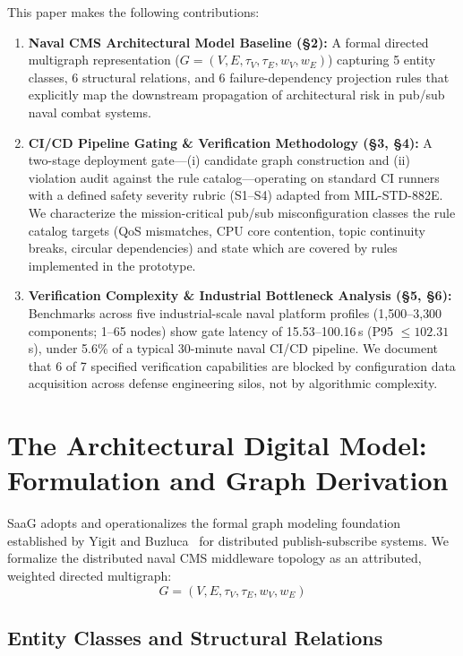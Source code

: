 \documentclass[sigconf,9pt]{acmart}
\begin{document}
This paper makes the following contributions:
\begin{enumerate}\itemsep=0.5pt
    \item \textbf{Naval CMS Architectural Model Baseline (\S2):} A formal directed multigraph representation ($G = (V, E, \tau_V, \tau_E, w_V, w_E)$) capturing 5 entity classes, 6 structural relations, and 6 failure-dependency projection rules that explicitly map the downstream propagation of architectural risk in pub/sub naval combat systems.
    \item \textbf{CI/CD Pipeline Gating \& Verification Methodology (\S3, \S4):} A two-stage deployment gate---(i) candidate graph construction and (ii) violation audit against the rule catalog---operating on standard CI runners with a defined safety severity rubric (S1--S4) adapted from MIL-STD-882E. We characterize the mission-critical pub/sub misconfiguration classes the rule catalog targets (QoS mismatches, CPU core contention, topic continuity breaks, circular dependencies) and state which are covered by rules implemented in the prototype.
    \item \textbf{Verification Complexity \& Industrial Bottleneck Analysis (\S5, \S6):} Benchmarks across five industrial-scale naval platform profiles (1{,}500--3{,}300 components; 1--65 nodes) show gate latency of 15.53--100.16\,s (P95 $\le 102.31$\,s), under 5.6\% of a typical 30-minute naval CI/CD pipeline. We document that 6 of 7 specified verification capabilities are blocked by configuration data acquisition across defense engineering silos, not by algorithmic complexity.
\end{enumerate}

\section{The Architectural Digital Model: Formulation and Graph Derivation}

SaaG adopts and operationalizes the formal graph modeling foundation established by Yigit and Buzluca~\cite{yigit2025graph} for distributed publish-subscribe systems. We formalize the distributed naval CMS middleware topology as an attributed, weighted directed multigraph:
\begin{equation}
G = (V, E, \tau_V, \tau_E, w_V, w_E)
\end{equation}

\subsection{Entity Classes and Structural Relations}
\end{document}
